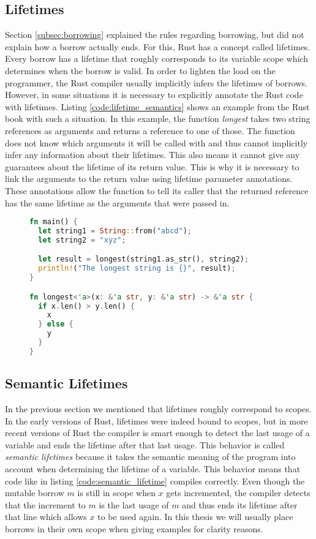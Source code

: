 \subsection{Lifetimes}
Section \ref{subsec:borrowing} explained the rules regarding borrowing, but did not explain how a borrow actually ends.
For this, Rust has a concept called lifetimes.
Every borrow has a lifetime that roughly corresponds to its variable scope which determines when the borrow is valid.
In order to lighten the load on the programmer, the Rust compiler usually implicitly infers the lifetimes of borrows.
However, in some situations it is necessary to explicitly annotate the Rust code with lifetimes.
Listing \ref{code:lifetime_semantics} shows an example from the Rust book \cite{rustbook} with such a situation.
In this example, the function \textit{longest} takes two string references as arguments and returns a reference to one of those.
The function does not know which arguments it will be called with and thus cannot implicitly infer any information about their lifetimes.
This also means it cannot give any guarantees about the lifetime of its return value.
This is why it is necessary to link the arguments to the return value using lifetime parameter annotations.
These annotations allow the function to tell its caller that the returned reference has the same lifetime as the arguments that were passed in.

\begin{figure}[h]
\begin{lstlisting}[language=Rust,frame=single,caption=Lifetime example. \cite{rustbook},label=code:lifetime_semantics]
fn main() {
  let string1 = String::from("abcd");
  let string2 = "xyz";

  let result = longest(string1.as_str(), string2);
  println!("The longest string is {}", result);
}

fn longest<'a>(x: &'a str, y: &'a str) -> &'a str {
  if x.len() > y.len() {
    x
  } else {
    y
  }
}
\end{lstlisting}
\end{figure}

\subsection{Semantic Lifetimes}
\label{sec:semantic_lifetimes}
In the previous section we mentioned that lifetimes roughly correspond to scopes.
In the early versions of Rust, lifetimes were indeed bound to scopes, but in more recent versions of Rust the compiler is smart enough to detect the last usage of a variable and ends the lifetime after that last usage.
This behavior is called \textit{semantic lifetimes} because it takes the semantic meaning of the program into account when determining the lifetime of a variable.
This behavior means that code like in listing \ref{code:semantic_lifetime} compiles correctly.
Even though the mutable borrow $m$ is still in scope when $x$ gets incremented, the compiler detects that the increment to $m$ is the last usage of $m$ and thus ends its lifetime after that line which allows $x$ to be used again.
In this thesis we will usually place borrows in their own scope when giving examples for clarity reasons.

